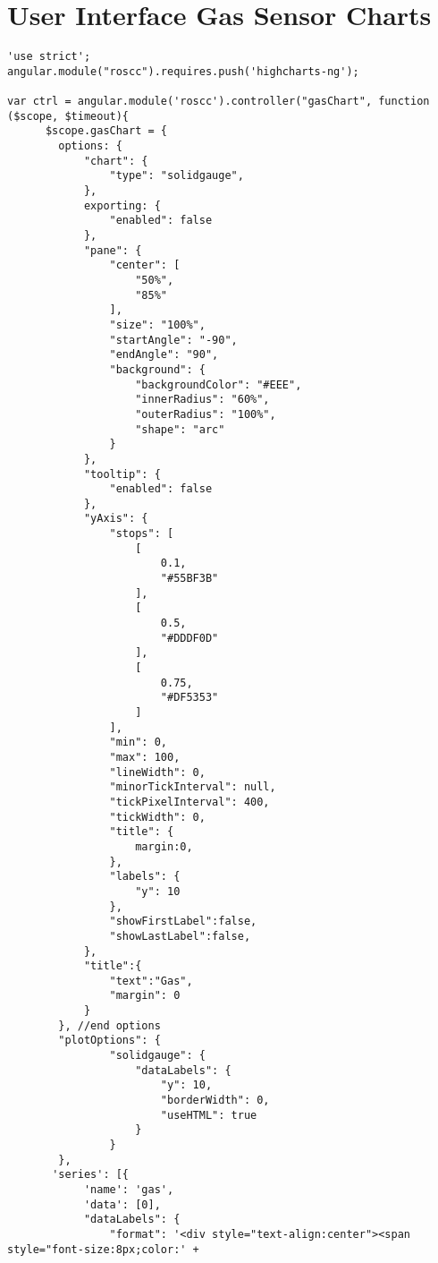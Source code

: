 \section*{User Interface Gas Sensor Charts}
\begin{lstlisting}[breaklines=true,basicstyle=\tiny]
'use strict';
angular.module("roscc").requires.push('highcharts-ng');

var ctrl = angular.module('roscc').controller("gasChart", function ($scope, $timeout){
      $scope.gasChart = {
        options: {
            "chart": {
                "type": "solidgauge",
            },
            exporting: { 
                "enabled": false 
            },
            "pane": {
                "center": [
                    "50%",
                    "85%"
                ],
                "size": "100%",
                "startAngle": "-90",
                "endAngle": "90",
                "background": {
                    "backgroundColor": "#EEE",
                    "innerRadius": "60%",
                    "outerRadius": "100%",
                    "shape": "arc"
                }
            },
            "tooltip": {
                "enabled": false
            },
            "yAxis": {
                "stops": [
                    [
                        0.1,
                        "#55BF3B"
                    ],
                    [
                        0.5,
                        "#DDDF0D"
                    ],
                    [
                        0.75,
                        "#DF5353"
                    ]
                ],
                "min": 0,
                "max": 100,
                "lineWidth": 0,
                "minorTickInterval": null,
                "tickPixelInterval": 400,
                "tickWidth": 0,
                "title": {
                    margin:0,
                },
                "labels": {
                    "y": 10
                },
                "showFirstLabel":false,
                "showLastLabel":false,
            },
            "title":{
                "text":"Gas",
                "margin": 0
            }
        }, //end options
        "plotOptions": {
                "solidgauge": {
                    "dataLabels": {
                        "y": 10,
                        "borderWidth": 0,
                        "useHTML": true
                    }
                }
        },
       'series': [{
            'name': 'gas',
            'data': [0],
            "dataLabels": {
                "format": '<div style="text-align:center"><span style="font-size:8px;color:' +

\end{lstlisting}
